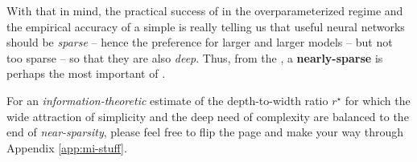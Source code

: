 With that in mind, the practical success of  in the overparameterized regime and the empirical accuracy of a simple  is really telling us that useful neural networks should be \emph{sparse}  -- hence the preference for larger and larger models -- but not too sparse -- so that they are also \emph{deep}.
Thus, from the , a \textbf{nearly-sparse}  is perhaps the most important
 of .

\sbreak


For 
an \emph{information-theoretic} estimate of the depth-to-width ratio $r^\star$
for which the wide attraction of simplicity and the deep need of complexity are balanced to the end of \emph{near-sparsity},
please 
feel free to flip the page and make your way through Appendix \ref{app:mi-stuff}.




















